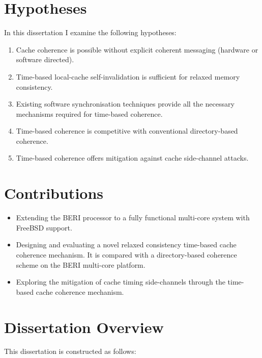 \clearpage
	\section{Hypotheses}
		\label{hypotheses}
		In this dissertation I examine the following hypotheses:
		\begin{enumerate}
			\item Cache coherence is possible without explicit coherent messaging (hardware or software directed).
			\item Time-based local-cache self-invalidation is sufficient for relaxed memory consistency.
			\item Existing software synchronisation techniques provide all the necessary mechanisms required for time-based coherence.
			\item Time-based coherence is competitive with conventional directory-based coherence.
			\item Time-based coherence offers mitigation against cache side-channel attacks.
		\end{enumerate}


	\section{Contributions}
		\begin{itemize}
			\item Extending the BERI processor to a fully functional multi-core system with FreeBSD support.
			\item Designing and evaluating a novel relaxed consistency time-based cache coherence mechanism. It is compared with a directory-based coherence scheme on the BERI multi-core platform.
			\item Exploring the mitigation of cache timing side-channels through the time-based cache coherence mechanism.
		\end{itemize}
		
	\section{Dissertation Overview}
		This dissertation is constructed as follows:
		
